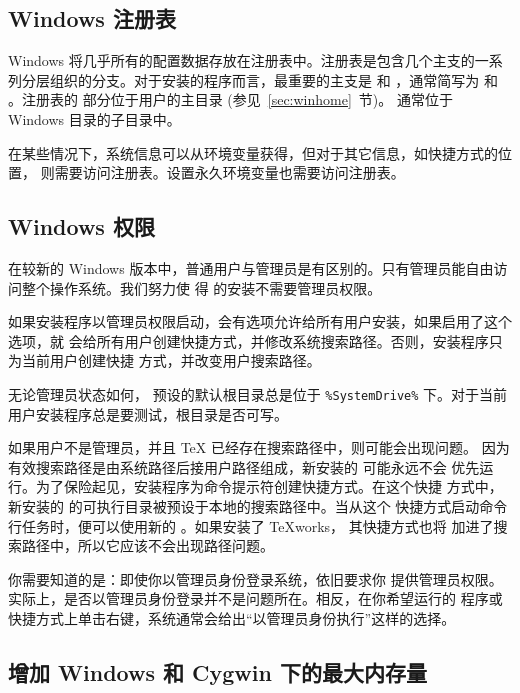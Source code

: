\documentclass{article}
\begin{document}
\subsection{Windows 注册表}
\label{sec:registry}

Windows 将几乎所有的配置数据存放在注册表中。注册表是包含几个主支的一系
列分层组织的分支。对于安装的程序而言，最重要的主支是 
和 ，通常简写为  和 。注册表的
 部分位于用户的主目录 (参见~\ref{sec:winhome}~节)。
通常位于 Windows 目录的子目录中。

在某些情况下，系统信息可以从环境变量获得，但对于其它信息，如快捷方式的位置，
则需要访问注册表。设置永久环境变量也需要访问注册表。


\subsection{Windows 权限}
\label{sec:winpermissions}

在较新的 Windows 版本中，普通用户与管理员是有区别的。只有管理员能自由访问整个操作系统。我们努力使
得 \TL{} 的安装不需要管理员权限。

如果安装程序以管理员权限启动，会有选项允许给所有用户安装，如果启用了这个选项，就
会给所有用户创建快捷方式，并修改系统搜索路径。否则，安装程序只为当前用户创建快捷
方式，并改变用户搜索路径。

无论管理员状态如何，\TL{} 预设的默认根目录总是位于 \verb|%SystemDrive%|
下。对于当前用户安装程序总是要测试，根目录是否可写。

如果用户不是管理员，并且 \TeX{} 已经存在搜索路径中，则可能会出现问题。
因为有效搜索路径是由系统路径后接用户路径组成，新安装的 \TL{} 可能永远不会
优先运行。为了保险起见，安装程序为命令提示符创建快捷方式。在这个快捷
方式中，新安装的 \TL{} 的可执行目录被预设于本地的搜索路径中。当从这个
快捷方式启动命令行任务时，便可以使用新的 \TL{}。如果安装了 \TeX{}works，
其快捷方式也将 \TL{} 加进了搜索路径中，所以它应该不会出现路径问题。

你需要知道的是：即使你以管理员身份登录系统，依旧要求你
提供管理员权限。实际上，是否以管理员身份登录并不是问题所在。相反，在你希望运行的
程序或快捷方式上单击右键，系统通常会给出“以管理员身份执行”这样的选择。

\subsection{增加 Windows 和 Cygwin 下的最大内存量}
\label{sec:cygwin-maxmem}
\end{document}
